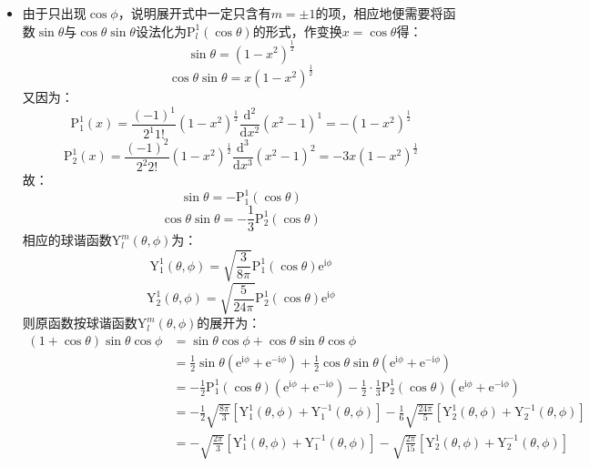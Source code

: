 \documentclass[fontset=windows]{ctexart}
\begin{document}
\begin{itemize}
    \item[10.(2)]
    由于只出现$\cos\phi$，说明展开式中一定只含有$m=\pm1$的项，相应地便需要将函数$\sin\theta$与$\cos\theta\sin\theta$设法化为$\mathrm{P}_l^1(\cos\theta)$的形式，作变换$x=\cos\theta$得：
    \[
    \sin\theta = (1-x^2)^{\tfrac{1}{2}}
    \]
    \[
    \cos\theta\sin\theta = x(1-x^2)^{\tfrac{1}{2}}
    \]
    又因为：
    \[
    \mathrm{P}_1^1(x) = \frac{(-1)^1}{2^1 1!}(1-x^2)^{\tfrac{1}{2}}\frac{\mathrm{d}^2}{\mathrm{d}x^2}(x^2-1)^1 = -(1-x^2)^{\tfrac{1}{2}}
    \]
    \[
    \mathrm{P}_2^1(x) = \frac{(-1)^2}{2^2 2!}(1-x^2)^{\tfrac{1}{2}}\frac{\mathrm{d}^3}{\mathrm{d}x^3}(x^2-1)^2 = -3x(1-x^2)^{\tfrac{1}{2}}
    \]
    故：
    \[
    \sin\theta = -\mathrm{P}_1^1(\cos\theta)
    \]
    \[
    \cos\theta\sin\theta = -\frac{1}{3}\mathrm{P}_2^1(\cos\theta)
    \]
    相应的球谐函数$\mathrm{Y}_l^m(\theta,\phi)$为：
    \[
    \mathrm{Y}_1^1(\theta,\phi) = \sqrt{\frac{3}{8\pi}}\mathrm{P}_1^1(\cos\theta)\mathrm{e}^{\mathrm{i}\phi}
    \]
    \[
    \mathrm{Y}_2^1(\theta,\phi) = \sqrt{\frac{5}{24\pi}}\mathrm{P}_2^1(\cos\theta)\mathrm{e}^{\mathrm{i}\phi}
    \]
    则原函数按球谐函数$\mathrm{Y}_l^m(\theta,\phi)$的展开为：
    \begin{align*}
        (1+\cos\theta)\sin\theta\cos\phi
        &= \sin\theta\cos\phi + \cos\theta\sin\theta\cos\phi \\
        &= \frac{1}{2}\sin\theta(\mathrm{e}^{\mathrm{i}\phi} + \mathrm{e}^{-\mathrm{i}\phi}) + \frac{1}{2}\cos\theta\sin\theta(\mathrm{e}^{\mathrm{i}\phi} + \mathrm{e}^{-\mathrm{i}\phi}) \\
        &= -\frac{1}{2}\mathrm{P}_1^1(\cos\theta)(\mathrm{e}^{\mathrm{i}\phi} + \mathrm{e}^{-\mathrm{i}\phi}) - \frac{1}{2}\cdot\frac{1}{3}\mathrm{P}_2^1(\cos\theta)(\mathrm{e}^{\mathrm{i}\phi} + \mathrm{e}^{-\mathrm{i}\phi}) \\
        &= -\frac{1}{2}\sqrt{\frac{8\pi}{3}}\left[\mathrm{Y}_1^1(\theta,\phi) + \mathrm{Y}_1^{-1}(\theta,\phi)\right] - \frac{1}{6}\sqrt{\frac{24\pi}{5}}\left[\mathrm{Y}_2^1(\theta,\phi) + \mathrm{Y}_2^{-1}(\theta,\phi)\right] \\
        &= -\sqrt{\frac{2\pi}{3}}\left[\mathrm{Y}_1^1(\theta,\phi) + \mathrm{Y}_1^{-1}(\theta,\phi)\right] - \sqrt{\frac{2\pi}{15}}\left[\mathrm{Y}_2^1(\theta,\phi) + \mathrm{Y}_2^{-1}(\theta,\phi)\right]
    \end{align*}
    \bigskip


\end{itemize}
\end{document}

